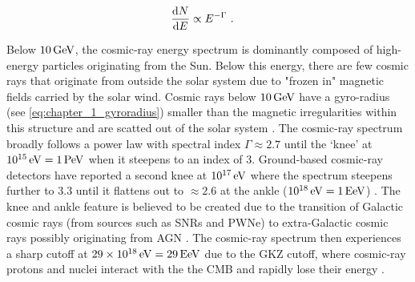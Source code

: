 \begin{equation}
    \begin{aligned}
    \dv{N}{E}&\propto E^{-\Gamma}\text{ .}
    \end{aligned}
\end{equation}

Below $10\,\GeV$, the cosmic-ray energy spectrum is dominantly composed of high-energy particles originating from the Sun. Below this energy, there are few cosmic rays that originate from outside the solar system due to "frozen in" magnetic fields carried by the solar wind. Cosmic rays below $10\,\GeV$ have a gyro-radius (see \autoref{eq:chapter_1_gyroradius}) smaller than the magnetic irregularities within this structure and are scatted out of the solar system \citep{2002cra..book.....S}. The cosmic-ray spectrum broadly follows a power law with spectral index $\Gamma\approx 2.7$ until the `knee' at $10^{15}\,\eV=1\,\PeV$ when it steepens to an index of $3$. Ground-based cosmic-ray detectors have reported a second knee at $10^{17}\,\eV$ where the spectrum steepens further to $3.3$ until it flattens out to $\approx 2.6$ at the ankle ($10^{18}\,\eV=1\,\si{E\electronvolt}$) \citep{2008ApJ...678.1165A,2010PhLB..685..239A, 2013PhRvD..87h1101A, 2013PhRvD..88d2004A,2013ApJ...768L...1A}. The knee and ankle feature is believed to be created due to the transition of Galactic cosmic rays (from sources such as SNRs and PWNe) to extra-Galactic cosmic rays possibly originating from AGN \citep{2016A&A...595A..33T}. The cosmic-ray spectrum then experiences a sharp cutoff at $29\times10^{18}\,\eV = 29\,\si{E\electronvolt}$ due to the GKZ cutoff, where cosmic-ray protons and nuclei interact with the the CMB and rapidly lose their energy \citep{1966PhRvL..16..748G,1966JETPL...4...78Z}. 

